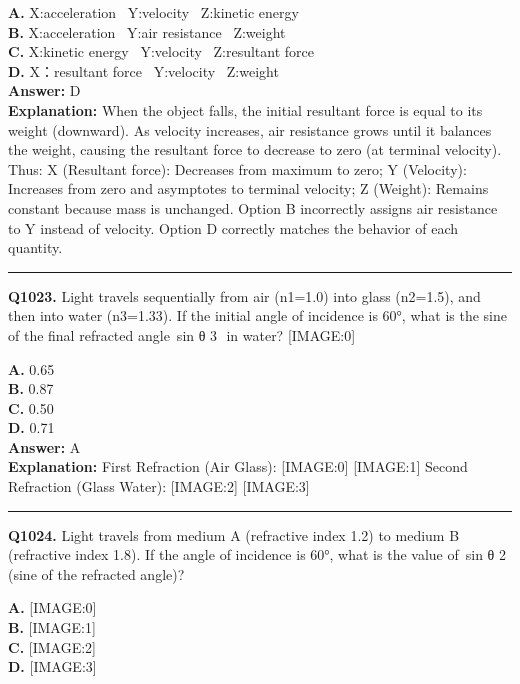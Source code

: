 \documentclass[12pt]{article}
\begin{document}
\textbf{A.} X:acceleration  Y:velocity  Z:kinetic energy \\
\textbf{B.} X:acceleration  Y:air resistance  Z:weight \\
\textbf{C.} X:kinetic energy  Y:velocity  Z:resultant force \\
\textbf{D.} X：resultant force  Y:velocity  Z:weight \\

\textbf{Answer:} D \\
\textbf{Explanation:} When the object falls, the initial resultant force is equal to its weight (downward). As velocity increases, air resistance grows until it balances the weight, causing the resultant force to decrease to zero (at terminal velocity). Thus:
X (Resultant force): Decreases from maximum to zero;
Y (Velocity): Increases from zero and asymptotes to terminal velocity;
Z (Weight): Remains constant because mass is unchanged.
Option B incorrectly assigns air resistance to Y instead of velocity. Option D correctly matches the behavior of each quantity.

\hrule
\vspace{1em}


\noindent
\textbf{Q1023.} Light travels sequentially from air (n1=1.0) into glass (n2=1.5), and then into water (n3=1.33). If the initial angle of incidence is 60°, what is the sine of the final refracted angle sin
θ
3
​
in water?
[IMAGE:0]



\textbf{A.} 0.65 \\
\textbf{B.} 0.87 \\
\textbf{C.} 0.50 \\
\textbf{D.} 0.71 \\

\textbf{Answer:} A \\
\textbf{Explanation:} First Refraction (Air \to  Glass):
[IMAGE:0]
[IMAGE:1]
Second Refraction (Glass \to  Water):
[IMAGE:2]
[IMAGE:3]

\hrule
\vspace{1em}


\noindent
\textbf{Q1024.} Light travels from medium A (refractive index 1.2) to medium B (refractive index 1.8). If the angle of incidence is 60°, what is the value of sin
θ
2
​
(sine of the refracted angle)?



\textbf{A.} [IMAGE:0] \\
\textbf{B.} [IMAGE:1] \\
\textbf{C.} [IMAGE:2] \\
\textbf{D.} [IMAGE:3] \\
\end{document}
